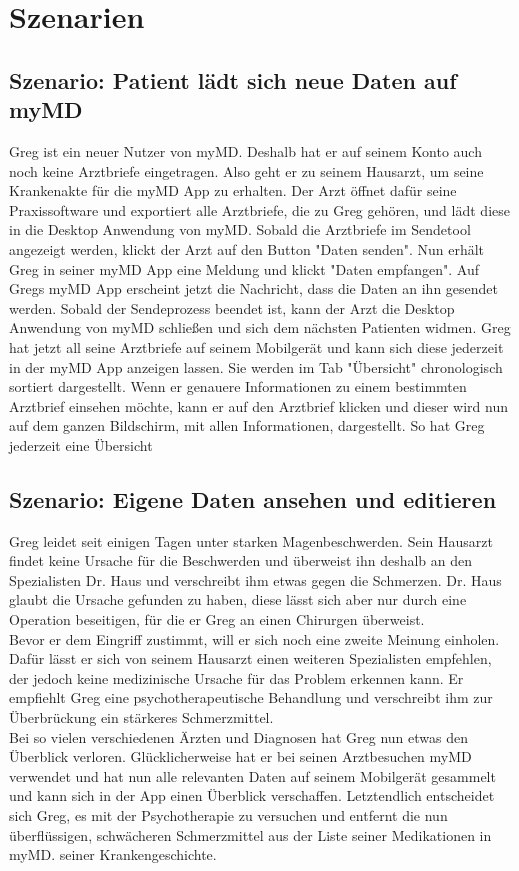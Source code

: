 \documentclass[a4paper]{scrreprt}
\begin{document}
\section{Szenarien}
\subsection{Szenario: Patient lädt sich neue Daten auf myMD}
Greg ist ein neuer Nutzer von myMD. Deshalb hat er auf seinem Konto auch noch keine Arztbriefe eingetragen. Also geht er zu seinem Hausarzt, um seine Krankenakte für die myMD \gls{App} zu erhalten. Der Arzt öffnet dafür seine Praxissoftware und exportiert alle Arztbriefe, die zu Greg gehören, und lädt diese in die \gls{Desktop Anwendung} von myMD. Sobald die Arztbriefe im Sendetool angezeigt werden, klickt der Arzt auf den Button "Daten senden". Nun erhält Greg in seiner myMD \gls{App} eine Meldung und klickt "Daten empfangen". Auf Gregs myMD \gls{App} erscheint jetzt die Nachricht, dass die Daten an ihn gesendet werden. Sobald der Sendeprozess beendet ist, kann der Arzt die \gls{Desktop Anwendung} von myMD schließen und sich dem nächsten Patienten widmen. Greg hat jetzt all seine Arztbriefe auf seinem Mobilgerät und kann sich diese jederzeit in der myMD \gls{App} anzeigen lassen. Sie werden im Tab "Übersicht" chronologisch sortiert dargestellt. Wenn er genauere Informationen zu einem bestimmten Arztbrief einsehen möchte, kann er auf den Arztbrief klicken und dieser wird nun auf dem ganzen Bildschirm, mit allen Informationen, dargestellt. So hat Greg jederzeit eine Übersicht

\subsection{Szenario: Eigene Daten ansehen und editieren}
Greg leidet seit einigen Tagen unter starken Magenbeschwerden. Sein Hausarzt findet keine Ursache für die Beschwerden und überweist ihn deshalb an den Spezialisten Dr. Haus und verschreibt ihm etwas gegen die Schmerzen. Dr. Haus glaubt die Ursache gefunden zu haben, diese lässt sich aber nur durch eine Operation beseitigen, für die er Greg an einen Chirurgen überweist. \\
Bevor er dem Eingriff zustimmt, will er sich noch eine zweite Meinung einholen. Dafür lässt er sich von seinem Hausarzt einen weiteren Spezialisten empfehlen, der jedoch keine medizinische Ursache für das Problem erkennen kann. Er empfiehlt Greg eine psychotherapeutische Behandlung und verschreibt ihm zur Überbrückung ein stärkeres Schmerzmittel. \\ 
Bei so vielen verschiedenen Ärzten und Diagnosen hat Greg nun etwas den Überblick verloren. Glücklicherweise hat er bei seinen Arztbesuchen myMD verwendet und hat nun alle relevanten Daten auf seinem Mobilgerät gesammelt und kann sich in der App einen Überblick verschaffen. Letztendlich entscheidet sich Greg, es mit der Psychotherapie zu versuchen und entfernt die nun überflüssigen, schwächeren Schmerzmittel aus der Liste seiner Medikationen in myMD. seiner Krankengeschichte.
\end{document}
